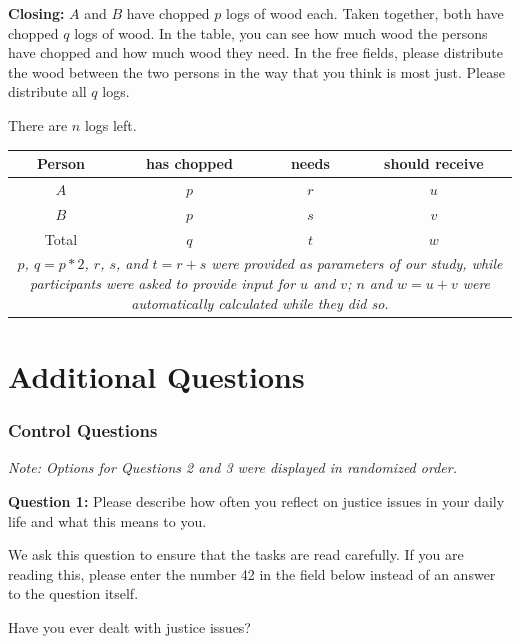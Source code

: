 \documentclass[egregdoesnotlikesansseriftitles]{scrartcl}
\begin{document}
\noindent\textbf{Closing:}
$A$ and $B$ have chopped $p$ logs of wood each.
Taken together, both have chopped $q$ logs of wood.
In the table, you can see how much wood the persons have chopped and how much wood they need.
In the free fields, please distribute the wood between the two persons in the way that you think is most just.
Please distribute all $q$ logs.\vspace{2ex}

There are $n$ logs left.

\begin{table}[ht]
   \centering
   \begin{tabular}{cccc}\hline
      Person   & has chopped   & needs   & should receive   \\\hline\hline
      $A$      & $p$           & $r$     & $u$              \\
      $B$      & $p$           & $s$     & $v$              \\\hline
      Total    & $q$           & $t$     & $w$              \\\hline
      \multicolumn{4}{p{7.5cm}}{\footnotesize \textit{$p$, $q=p*2$, $r$, $s$, and $t=r+s$ were provided as parameters of our study, while participants were asked to provide input for $u$ and $v$; $n$ and $w=u+v$ were automatically calculated while they did so.}}
   \end{tabular}
\end{table}


\clearpage
\section{Additional Questions}\label{sec:app_questions}

\subsubsection*{Control Questions}
\noindent\textit{Note: Options for Questions 2 and 3 were displayed in randomized order.}\vspace{1ex}

\noindent\textbf{Question 1:} Please describe how often you reflect on justice issues in your daily life and what this means to you.

We ask this question to ensure that the tasks are read carefully.
If you are reading this, please enter the number 42 in the field below instead of an answer to the question itself.

Have you ever dealt with justice issues?\vspace{1ex}
\end{document}
